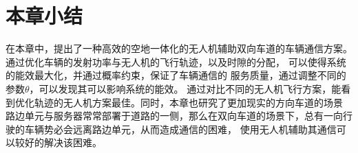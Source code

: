 \section{本章小结}\label{section4-6}

在本章中，提出了一种高效的空地一体化的无人机辅助双向车道的车辆通信方案。通过优化车辆的发射功率与无人机的飞行轨迹，以及时隙的分配，
可以使得系统的能效最大化，并通过概率约束，保证了车辆通信的 服务质量，通过调整不同的参数$\theta$，可以发现其可以影响系统的能效。
通过对比不同的无人机飞行方案，能看到优化轨迹的无人机方案最佳。同时，本章也研究了更加现实的方向车道的场景
路边单元与服务器常常部署于道路的一侧，那么在双向车道的场景下，总有一向行驶的车辆势必会远离路边单元，从而造成通信的困难，
使用无人机辅助其通信可以较好的解决该困难。

